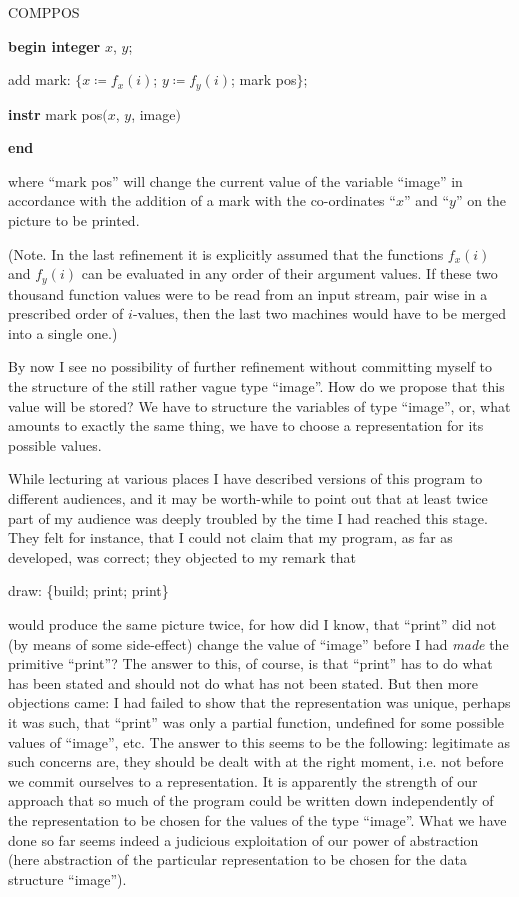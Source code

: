 \documentclass[twoside,11pt]{book}
\begin{document}
COMPPOS
\nopagebreak

\textbf{begin integer} $x$, $y$;
\nopagebreak

\quad add mark: $\{x \coloneq f_x(i)$; $y \coloneq f_y(i)$; mark pos$\}$;

\quad\textbf{instr} mark pos$(x$, $y$, image$)$

\textbf{end}

\noindent
where ``mark pos'' will change the current value of the variable ``image'' in accordance with the addition of a mark with the co-ordinates ``$x$'' and ``$y$'' on the picture to be printed.

(Note. In the last refinement it is explicitly assumed that the functions $f_x(i)$ and $f_y(i)$ can be evaluated in any order of their argument values. If these two thousand function values were to be read from an input stream, pair wise in a prescribed order of $i$-values, then the last two machines would have to be merged into a single one.)

By now I see no possibility of further refinement without committing myself to the structure of the still rather vague type ``image''. How do we propose that this value will be stored? We have to structure the variables of type ``image'', or, what amounts to exactly the same thing, we have to choose a representation for its possible values.

While lecturing at various places I have described versions of this program to different audiences, and it may be worth-while to point out that at least twice part of my audience was deeply troubled by the time I had reached this stage. They felt for instance, that I could not claim that my program, as far as developed, was correct; they objected to my remark that

draw: \{build; print; print\}

\noindent
would produce the same picture twice, for how did I know, that ``print'' did not (by means of some side-effect) change the value of ``image'' before I had \textit{made} the primitive ``print''? The answer to this, of course, is that ``print'' has to do what has been stated and should not do what has not been stated. But then more objections came: I had failed to show that the representation was unique, perhaps it was such, that ``print'' was only a partial function, undefined for some possible values of ``image'', etc. The answer to this seems to be the following: legitimate as such concerns are, they should be dealt with at the right moment, i.e. not before we commit ourselves to a representation. It is apparently the strength of our approach that so much of the program could be written down independently of the representation to be chosen for the values of the type ``image''. What we have done so far seems indeed a judicious exploitation of our power of abstraction (here abstraction of the particular representation to be chosen for the data structure ``image'').
\end{document}
